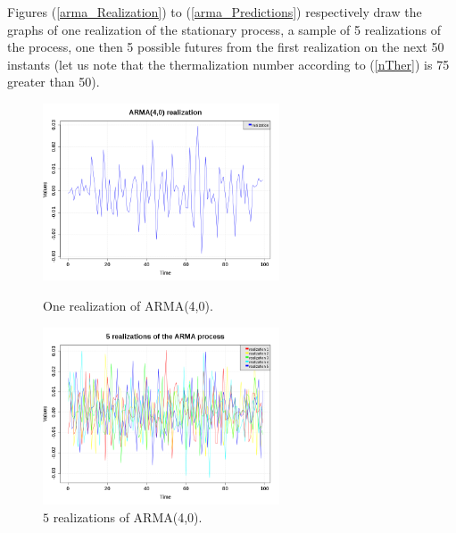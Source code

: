 Figures (\ref{arma_Realization}) to (\ref{arma_Predictions}) respectively draw the graphs of one realization of the stationary process, a sample of 5 realizations of the process, one then 5  possible futures from the first realization on the next 50 instants (let us note that the thermalization number according to (\ref{nTher}) is 75 greater than 50).


\begin{figure}[H]
  \begin{minipage}{9cm}
    \begin{center}
      \includegraphics[width=7cm]{Figures/arma1D_realization.png}
      \caption{One realization of ARMA(4,0).}
      \label{arma_Realization}
    \end{center}
  \end{minipage}
  \hfill
  \begin{minipage}{9cm}
    \begin{center}
      \includegraphics[width=7cm]{Figures/arma1D_realizations.png}
      \caption{$5$ realizations of ARMA(4,0).}
      \label{arma_Realizations}
    \end{center}
  \end{minipage}
\end{figure}


